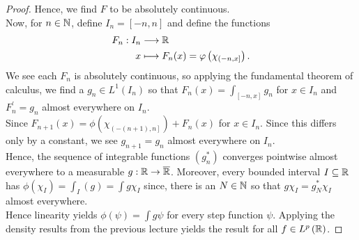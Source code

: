 \begin{proof}
Hence, we find \(F\) to be absolutely continuous.\\
Now, for \(n \in \mathbb{N}\), define \(I_{n} = \left[ -n, n \right] \) and define the functions \begin{align*}
	F_{n}: I_{n} &\longrightarrow \mathbb{R} \\
	x &\longmapsto F_{n}(x) =  \varphi\left( \chi_{\left( -n, x \right] } \right)
.\end{align*} We see each \(F_{n}\) is absolutely continuous, so applying the fundamental theorem of calculus, we find a \(g_{n} \in L^{1}\left( I_{n} \right) \) so that \(F_{n}\left( x \right) = \int_{\left[ -n, x \right] } g_{n}\) for \(x \in I_{n}\) and \(F_{n}^{\prime} = g_{n}\) almost everywhere on \(I_{n}\).\\
Since \(F_{n+1}\left( x \right) = \phi\left( \chi_{\left( -\left( n+1 \right), n  \right] } \right) + F_{n}\left( x \right) \) for \(x \in I_{n}\). Since this differs only by a constant, we see \(g_{n+1} = g_{n}\) almost everywhere on \(I_{n}\).\\
Hence, the sequence of integrable functions \(\left( g_{n}^{*} \right) \) converges pointwise almost everywhere to a measurable \(g: \mathbb{R} \to \overline{\mathbb{R}}\). Moreover, every bounded interval \(I \subseteq \mathbb{R}\) has \( \phi\left( \chi_{I} \right) = \int_{I}\left( g \right) = \int g \chi_{I}\) since, there is an \(N \in \mathbb{N}\) so that \(g \chi_{I}= g_{N}^{*} \chi_{I}\) almost everywhere.\\
Hence linearity yields \( \phi\left( \psi \right)  = \int g \psi\) for every step function \(\psi\). Applying the density results from the previous lecture yields the result for all \(f \in L^{p}\left( \mathbb{R} \right) \).
\end{proof}
